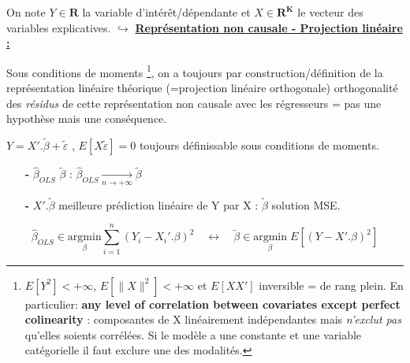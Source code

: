 \noindent \textbf{}
\noindent On note $Y \in \mathbf{R}$ la variable d'intérêt/dépendante et $X \in \mathbf{R}^{\textbf{K}}$ le vecteur des variables explicatives.
\bigbreak
\noindent $\hookrightarrow$ \underline{\textbf{Représentation non causale - Projection linéaire :}}\par
Sous conditions de moments \footnote{$E[Y^{2}]<+\infty$, $E[\lVert X \rVert^{2}]<+\infty$ et $E[XX']$ inversible = de rang plein. En particulier: \textbf{any level of correlation between covariates except perfect colinearity} : composantes de X linéairement indépendantes mais \textit{n'exclut pas} qu'elles soients corrélées. Si le modèle a une constante et une variable catégorielle il faut exclure une des modalités.}, on a toujours par construction/définition de la représentation linéaire théorique (=projection linéaire orthogonale) orthogonalité des \textit{résidus} de cette représentation non causale avec les régresseurs = pas une hypothèse mais une conséquence.\par
\begin{boxH}
    $Y = X'.\widetilde{\beta} + \widetilde{\varepsilon}$ , $E[X\widetilde{\varepsilon}]=0$ toujours définissable sous conditions de moments.\par
    \begin{itemize}
        \item[\textbf{-}] $\widehat{\beta}_{OLS}$  $\widetilde{\beta}$ : $\widehat{\beta}_{OLS} \underset{n \to +\infty}{\longrightarrow} \widetilde{\beta}$\par
        \item[\textbf{-}] $X'.\widetilde{\beta}$ meilleure prédiction linéaire de Y par X : $\widetilde{\beta}$ solution MSE.
    \end{itemize}
\end{boxH}

\begin{equation*} 
    \widehat{\beta}_{OLS} \in \underset{\beta}{\mathrm{argmin}} \sum_{i = 1}^{n}{(Y_{i} - X_{i}'.\beta)^{2}} \quad \longleftrightarrow \quad \widetilde{\beta} \in \underset{\beta}{\mathrm{argmin}} \; E[(Y-X'.\beta)^{2}]
\end{equation*}

